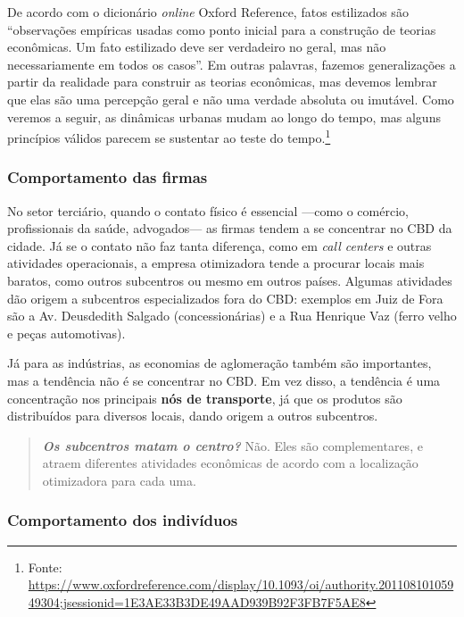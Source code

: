 \documentclass[
  12pt,
  a4paper,
]{article}
\begin{document}
De acordo com o dicionário \emph{online} Oxford Reference, fatos
estilizados são ``observações empíricas usadas como ponto inicial para a
construção de teorias econômicas. Um fato estilizado deve ser verdadeiro
no geral, mas não necessariamente em todos os casos''. Em outras
palavras, fazemos generalizações a partir da realidade para construir as
teorias econômicas, mas devemos lembrar que elas são uma percepção geral
e não uma verdade absoluta ou imutável. Como veremos a seguir, as
dinâmicas urbanas mudam ao longo do tempo, mas alguns princípios válidos
parecem se sustentar ao teste do tempo.\footnote{Fonte:
  \url{https://www.oxfordreference.com/display/10.1093/oi/authority.20110810105949304;jsessionid=1E3AE33B3DE49AAD939B92F3FB7F5AE8}}

\hypertarget{comportamento-das-firmas}{%
\subsubsection{Comportamento das
firmas}\label{comportamento-das-firmas}}

No setor terciário, quando o contato físico é essencial ---como o
comércio, profissionais da saúde, advogados--- as firmas tendem a se
concentrar no CBD da cidade. Já se o contato não faz tanta diferença,
como em \emph{call centers} e outras atividades operacionais, a empresa
otimizadora tende a procurar locais mais baratos, como outros subcentros
ou mesmo em outros países. Algumas atividades dão origem a subcentros
especializados fora do CBD: exemplos em Juiz de Fora são a Av.
Deusdedith Salgado (concessionárias) e a Rua Henrique Vaz (ferro velho e
peças automotivas).

Já para as indústrias, as economias de aglomeração também são
importantes, mas a tendência não é se concentrar no CBD. Em vez disso, a
tendência é uma concentração nos principais \textbf{nós de transporte},
já que os produtos são distribuídos para diversos locais, dando origem a
outros subcentros.

\begin{quote}
\textbf{\emph{Os subcentros matam o centro?}} Não. Eles são
complementares, e atraem diferentes atividades econômicas de acordo com
a localização otimizadora para cada uma.
\end{quote}

\hypertarget{comportamento-dos-indivuxedduos}{%
\subsubsection{Comportamento dos
indivíduos}\label{comportamento-dos-indivuxedduos}}
\end{document}
